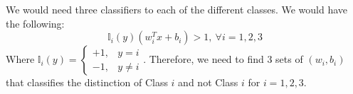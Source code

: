 We would need three classifiers to each of the different classes. We would have the following:
$$
\mathbb{I}_i(y)(w_i^T x + b_i) > 1, ~\forall i = 1,2,3
$$
Where $\mathbb{I}_i(y) = \begin{cases} +1, &y = i\\
-1, &y \neq i
\end{cases}$.
Therefore, we need to find 3 sets of $(w_i, b_i)$ that classifies the distinction of Class $i$ and not Class $i$ for $i = 1,2,3$. 
